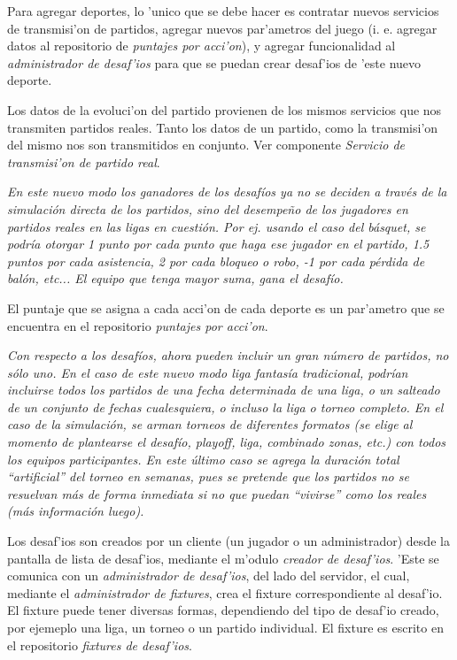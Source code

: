 Para agregar deportes, lo 'unico que se debe hacer es contratar nuevos servicios de transmisi'on de partidos, agregar nuevos par'ametros del juego (i. e. agregar datos al repositorio de \textit{puntajes por acci'on}), y agregar funcionalidad al \textit{administrador de desaf'ios} para que se puedan crear desaf'ios de 'este nuevo deporte.

Los datos de la evoluci'on del partido provienen de los mismos servicios que nos transmiten partidos reales. Tanto los datos de un partido, como la transmisi'on del mismo nos son transmitidos en conjunto. Ver componente \textit{Servicio de transmisi'on de partido real}.

\textit{En este nuevo modo los ganadores de los desafíos ya no se deciden a través de la simulación directa de los partidos, sino del desempeño de los jugadores en partidos reales en las ligas en cuestión. Por ej. usando el caso del básquet, se podría otorgar 1 punto por cada punto que haga ese jugador en el partido, 1.5 puntos por cada asistencia, 2 por cada bloqueo o robo, -1 por cada pérdida de balón, etc... El equipo que tenga mayor suma, gana el desafío.}

El puntaje que se asigna a cada acci'on de cada deporte es un par'ametro que se encuentra en el repositorio \textit{puntajes por acci'on}.

\textit{Con respecto a los desafíos, ahora pueden incluir un gran número de partidos, no sólo uno. En el caso de este nuevo modo liga fantasía tradicional, podrían incluirse todos los partidos de una fecha determinada de una liga, o un salteado de un conjunto de fechas cualesquiera, o incluso la liga o torneo completo.
En el caso de la simulación, se arman torneos de diferentes formatos (se elige al momento de plantearse el desafío, playoff, liga, combinado zonas, etc.) con todos los equipos participantes. En este último caso se agrega la duración total “artificial” del torneo en semanas, pues se pretende que los partidos no se resuelvan más de forma inmediata si no que puedan “vivirse” como los
reales (más información luego).
}

Los desaf'ios son creados por un cliente (un jugador o un administrador) desde la pantalla de lista de desaf'ios, mediante el m'odulo \textit{creador de desaf'ios}. 'Este se comunica con un \textit{administrador de desaf'ios}, del lado del servidor, el cual, mediante el \textit{administrador de fixtures}, crea el fixture correspondiente al desaf'io. El fixture puede tener diversas formas, dependiendo del tipo de desaf'io creado, por ejemeplo una liga, un torneo o un partido individual. El fixture es escrito en el repositorio \textit{fixtures de desaf'ios}.

